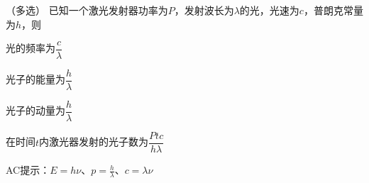 （多选）
已知一个激光发射器功率为\(P\)，发射波长为\(\lambda\)的光，光速为\(c\)，普朗克常量为\(h\)，则\paren[]
\begin{choices}
	\item 光的频率为\(\dfrac{c}{\lambda}\)
	\item 光子的能量为\(\dfrac{h}{\lambda}\)
	\item 光子的动量为\(\dfrac{h}{\lambda}\)
	\item 在时间\(t\)内激光器发射的光子数为\(\dfrac{Ptc}{h\lambda}\)
\end{choices}
\begin{answer}
	AC\qquad 提示：\(E = h\nu\)、\(p = \frac{h}{\lambda}\)、\(c = \lambda\nu\)
\end{answer}